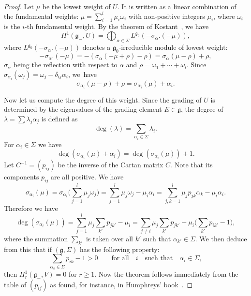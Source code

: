 \documentclass[pdftex]{sigma}%
\newcommand{\g}{\mathfrak g}
\numberwithin{equation}{section}
\begin{document}
\begin{proof}
	Let $\mu$ be the lowest weight of $U$.	It is written as a linear combination of the fundamental weights: $\mu = \sum_{i=1}^l \mu_i\omega_i$ with non-positive integers $\mu_i$, where $\omega_i$ is the $i$-th fundamental weight.
	By the theorem of Kostant~\cite{kost}, we have
	\[
	H^1(\g_- , U) = \bigoplus _{\alpha \in \Sigma}L^{\g_0}(-\sigma_{\alpha}.(-\mu)),
	\]
	where $L^{\g_0}(-\sigma_{\alpha}.(-\mu))$ denotes a $\g_0$-irreducible module of lowest weight:
	\[
	-\sigma_{\alpha}.(-\mu) = -(\sigma_{\alpha}(-\mu + \rho ) -\rho)
	= \sigma_{\alpha}(\mu - \rho ) +\rho,
	\]
	$\sigma_{\alpha}$ being the reflection with respect to $\alpha $ and
	$\rho = \omega_1 + \cdots + \omega_l $.
	Since $\sigma_{\alpha_i}(\omega_j) = \omega_j - \delta_{ij}\alpha_i$,
	we~have
	\[
	\sigma_{\alpha_i}(\mu - \rho ) +\rho = \sigma_{\alpha_i}(\mu ) +\alpha_i.
	\]
	
	Now let us compute the degree of this weight. Since the grading of $U$ is determined by the eigenvalues of the grading element $E\in\g$, the degree of $\lambda = \sum \lambda_j \alpha_j$ is defined as
	\[
	\deg(\lambda) = \sum _{\alpha_i \in \Sigma}\lambda_i.
	\]
	For $\alpha_i \in \Sigma$ we have
	\[
	\deg(\sigma_{\alpha_i}(\mu ) +\alpha_i) = \deg(\sigma_{\alpha_i}(\mu )) + 1 .
	\]
	Let $C^{-1}=(p_{ij})$ be the inverse of the Cartan matrix $C$. Note that its components $p_{ij}$ are all positive. We have
	\[
	\sigma_{\alpha_i}(\mu ) = \sigma_{\alpha_i}\bigg(\sum_{j=1}^l \mu_j \omega_j \bigg) = \sum_{j=1}^l \mu_j \omega_j - \mu_i\alpha_i
	= \sum_{j,k=1}^l \mu_j p_{jk} \alpha_k - \mu_i\alpha_i.
	\]
	Therefore we have
	\[
		\deg (\sigma_{\alpha_i}(\mu )) = \sum _{j=1}^l\mu_j\sum_{k'} p_{jk'} - \mu_i = \sum _{j\neq i}\mu_j \sum_{k'}p_{jk'} + \mu_i\bigg(\sum_{k'} p_{ik'}-1\bigg),
	\]
	where the summation $\sum_{k'}$ is taken over all $k'$ such that $\alpha_{k'} \in \Sigma$.
	We then deduce from this that if $(\g, \Sigma)$ has the following property:
	\[
	\sum _{\alpha_{k} \in \Sigma} p_{ik}-1 > 0 \qquad \text {for all}\quad i\quad
	\text{such that}\quad \alpha _i \in \Sigma,
	\]
	then
	$H^1_r(\g_-, V) = 0 $ for $r \ge 1$.
	Now the theorem follows immediately from the table of $(p_{ij})$
	as found, for instance, in Humphreys' book~\cite[p.~69]{humph}.
\end{proof}
\end{document}
